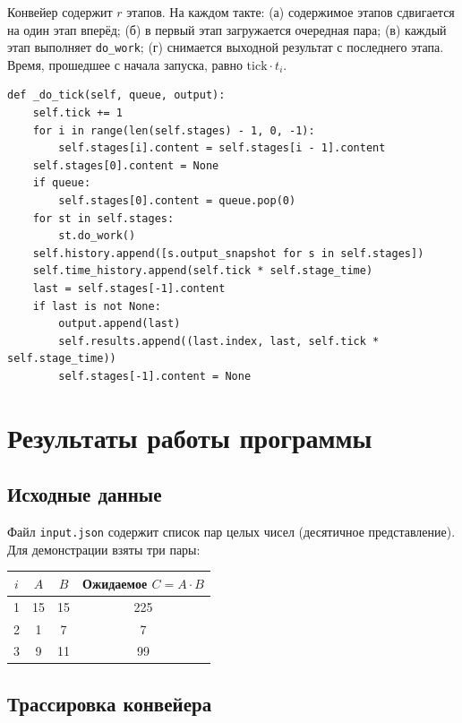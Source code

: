 \documentclass[12pt,a4paper]{article}
\begin{document}
Конвейер содержит $r$ этапов. На каждом такте:
(а) содержимое этапов сдвигается на один этап вперёд;
(б) в первый этап загружается очередная пара;
(в) каждый этап выполняет \texttt{do\_work};
(г) снимается выходной результат с последнего этапа.
Время, прошедшее с начала запуска, равно $\text{tick}\cdot t_i$.

\begin{lstlisting}[caption={Такт работы конвейера}]
def _do_tick(self, queue, output):
    self.tick += 1
    for i in range(len(self.stages) - 1, 0, -1):
        self.stages[i].content = self.stages[i - 1].content
    self.stages[0].content = None
    if queue:
        self.stages[0].content = queue.pop(0)
    for st in self.stages:
        st.do_work()
    self.history.append([s.output_snapshot for s in self.stages])
    self.time_history.append(self.tick * self.stage_time)
    last = self.stages[-1].content
    if last is not None:
        output.append(last)
        self.results.append((last.index, last, self.tick * self.stage_time))
        self.stages[-1].content = None
\end{lstlisting}

\section{Результаты работы программы}

\subsection{Исходные данные}

Файл \texttt{input.json} содержит список пар целых чисел
(десятичное представление). Для демонстрации взяты три пары:
\begin{center}
\begin{tabular}{c|c|c|c}
\toprule
$i$ & $A$ & $B$ & Ожидаемое $C = A\cdot B$ \\
\midrule
1 & 15 & 15 & 225 \\
2 &  1 &  7 &   7 \\
3 &  9 & 11 &  99 \\
\bottomrule
\end{tabular}
\end{center}

\subsection{Трассировка конвейера}
\end{document}
